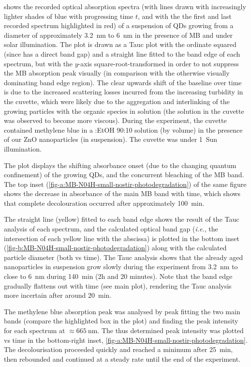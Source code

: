 \documentclass[9pt,twoside,twocolumn]{article}\usepackage{knitr}
\begin{document}
\begin{refsection}
 shows the recorded optical absorption spectra (with lines drawn with increasingly lighter shades of blue with progressing time $t$, and with the the first and last recorded spectrum highlighted in red) of a suspension of  QDs growing from a diameter of approximately \qty{3.2}{\nm} to \qty{6}{\nm} in the presence of MB and under solar illumination.
The plot is drawn as a Tauc plot with the ordinate squared (since  has a direct band gap) and a straight line fitted to the  band edge of each spectrum, but with the $y$-axis square-root-transformed in order to not suppress the MB absorption peak visually (in comparison with the otherwise visually dominating band edge region).
The clear upwards shift of the baseline over time is due to the increased scattering losses incurred from the increasing turbidity in the cuvette, which were likely due to the aggregation and interlinking of the growing  particles with the organic species in solution (the solution in the cuvette was observed to become more viscous). During the experiment, the cuvette contained methylene blue in a :EtOH 90:10 solution (by volume) in the presence of our ZnO nanoparticles (in suspension). The cuvette was under 1~Sun illumination.

The plot displays the shifting absorbance onset (due to the changing quantum confinement) of the growing  QDs, and the concurrent bleaching of the MB band.
The top inset (\cref{fig-a:MB-N04H-small-nostir-photodegradation}) of the same figure shows the decrease in absorbance of the main MB band with time, which shows that complete decolouration occurred after approximately \qty{100}{\minute}.

The straight line (yellow) fitted to each band edge shows the result of the Tauc analysis of each spectrum, and the calculated optical band gap (\textit{i.e.}, the intersection of each yellow line with the abscissa) is plotted in the bottom inset (\cref{fig-b:MB-N04H-small-nostir-photodegradation}) along with the calculated particle diameter (both vs time).
The Tauc analysis shows that the already aged  nanoparticles in suspension grow slowly during the experiment from \qty{3.2}{\nm} to close to \qty{6}{\nm} during \qty{140}{\minute} (2h and 20 minutes). Note that the band edge gradually flattens out with time (see main plot), rendering the Tauc analysis more incertain after around \qty{20}{\minute}.

The methylene blue absorption peak was analysed by peak fitting the two main bands (compare the highlighted box in the plot) and finding the peak intensity for each spectrum at $\approx\qty{665}{\nm}$. The thus determined peak intensity was plotted vs time in the bottom-right inset, \cref{fig-a:MB-N04H-small-nostir-photodegradation}. The decolourisation proceeded quickly and reached a minimum after \qty{25}{\minute}, then rebounded and continued at a steady rate until the end of the experiment.


\end{refsection}
\end{document}
